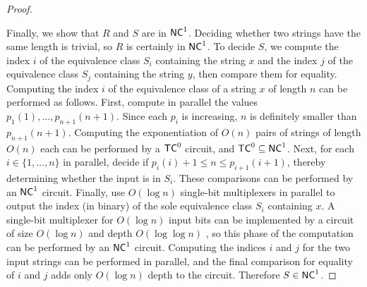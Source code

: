 \begin{proof}
\begin{figure}
\begin{center}
    \end{center}
  \end{figure}

  Finally, we show that $R$ and $S$ are in ${\mathsf{NC}}^1$.
  Deciding whether two strings have the same length is trivial, so $R$ is certainly in ${\mathsf{NC}}^1$.
  To decide $S$, we compute the index $i$ of the equivalence class $S_i$ containing the string $x$ and the index $j$ of the equivalence class $S_j$ containing the string $y$, then compare them for equality.
  Computing the index $i$ of the equivalence class of a string $x$ of length $n$ can be performed as follows.
  First, compute in parallel the values $p_1(1), \dotsc, p_{n + 1}(n + 1)$.
  Since each $p_i$ is increasing, $n$ is definitely smaller than $p_{n + 1}(n + 1)$.
  Computing the exponentiation of $O(n)$ pairs of strings of length $O(n)$ each can be performed by a ${\mathsf{TC}}^0$ circuit, and ${\mathsf{TC}}^0 \subseteq {\ensuremath{\mathsf{NC}}}^1$.
  Next, for each $i \in \{1, \dotsc, n\}$ in parallel, decide if $p_i(i) + 1 \leq n \leq p_{i + 1}(i + 1)$, thereby determining whether the input is in $S_i$.
  These comparisons can be performed by an ${\mathsf{NC}}^1$ circuit.
  Finally, use $O(\log n)$ single-bit multiplexers in parallel to output the index (in binary) of the sole equivalence class $S_i$ containing $x$.
  A single-bit multiplexer for $O(\log n)$ input bits can be implemented by a circuit of size $O(\log n)$ and depth $O(\log \log n)$ \autocite[Lemma~2.5.5]{savage98}, so this phase of the computation can be performed by an ${\mathsf{NC}}^1$ circuit.
  Computing the indices $i$ and $j$ for the two input strings can be performed in parallel, and the final comparison for equality of $i$ and $j$ adds only $O(\log n)$ depth to the circuit.
  Therefore $S \in {\ensuremath{\mathsf{NC}}}^1$.
\end{proof}
